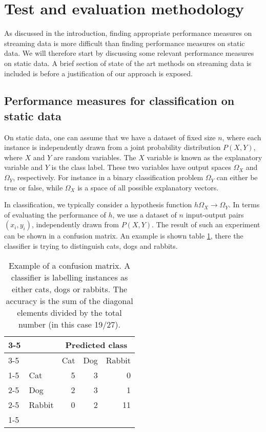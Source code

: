 \section{Test and evaluation methodology}
\label{sec:methodology}

As discussed in the introduction, finding appropriate performance measures on streaming data is more difficult than finding performance measures on static data.  We will therefore start by discussing some relevant performance measures on static data.  A brief section of state of the art methods on streaming data is included is before a justification of our approach is exposed.  

\subsection{Performance measures for classification on static data}
\label{sec:static}

On static data, one can assume that we have a dataset of fixed size $n$, where each instance is independently drawn from a joint probability distribution $P(X,Y)$, where $X$ and $Y$ are random variables. The $X$ variable is known as the explanatory variable and $Y$ is the class label.  These two variables have output spaces $\Omega_X$ and $\Omega_Y$, respectively.  For instance in a binary classification problem  $\Omega_Y$ can either be true or false, while $\Omega_X$ is a space of all possible explanatory vectors.  

In classification, we typically consider a hypothesis function $h\Omega_X \rightarrow \Omega_Y$.  In terms of evaluating the performance of $h$, we use a dataset of $n$ input-output pairs $(x_i, y_i)$, independently drawn from $P(X,Y)$. The result of such an experiment can be shown in a confusion matrix.  An example is shown table \ref{tab:catdograbbit}, there the classifier is trying to distinguish cats, dogs and rabbits. 

\vspace{1ex}
\begin{table}
\centering
\begin{tabular}{ll|r|r|r|}
\cline{3-5}
&&  \multicolumn{3}{c|}{Predicted class}\\
\cline{3-5}
&& Cat & Dog & Rabbit\\ 
\cline{1-5}
\multicolumn{1}{ |c| }{\multirow{3}{*}{Actual class} }
 & Cat & 5 & 3& 0\\
\cline{2-5}
\multicolumn{1}{ |c| }{} & Dog & 2 & 3 & 1\\
\cline{2-5}
\multicolumn{1}{ |c| }{} & Rabbit & 0 & 2 & 11\\
\cline{1-5}
\end{tabular}
\caption{Example of a confusion matrix.  A classifier is labelling instances as either cats, dogs or rabbits.  The accuracy is the sum of the diagonal elements divided by the total number (in this case 19/27).}
\label{tab:catdograbbit}
\end{table}
\vspace{1ex}

